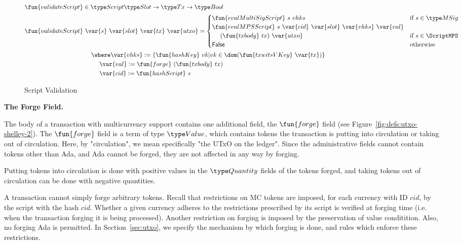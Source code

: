\begin{figure*}[htb]
    \begin{align*}
      \fun{validateScript} & \in\Script\Slot\to\Tx\to\Bool \\
      \fun{validateScript} & ~\var{s}~\var{slot}~\var{tx}~\var{utxo}=
                             \begin{cases}
                               \fun{evalMultiSigScript}~s~vhks & \text{if}~s \in\MSig \\
                               \fun{evalMPSScript}~s~\var{cid}~\var{slot}~\var{vhks}~\var{val} \\
                                ~~~~(\fun{txbody}~tx)~\var{utxo} & \text{if}~s \in\ScriptMPS \\
                               \mathsf{False} & \text{otherwise}
                             \end{cases} \\
                           & ~~~~\where \var{vhks}\leteq \{\fun{hashKey}~vk \vert
                             vk \in \dom(\fun{txwitsVKey}~\var{tx})\} \\
                           & ~~~~~~~~ \var{val} \leteq \fun{forge}~
                              (\fun{txbody}~tx) \\
                           & ~~~~~~~~ \var{cid} \leteq \fun{hashScript}~s
    \end{align*}
  \caption{Script Validation}
  \label{fig:defs:tx-mc-valid}
\end{figure*}

\textbf{The Forge Field.}

The body of a transaction with multicurrency support contains one additional
field, the $\fun{forge}$ field (see Figure~\ref{fig:defs:utxo-shelley-2}).
The $\fun{forge}$ field is a term of type $\Value$, which contains
tokens the transaction is putting into circulation or taking out of
circulation. Here, by "circulation", we mean specifically "the UTxO on the
ledger". Since the administrative fields cannot contain tokens other than Ada,
and Ada cannot be forged, they are not affected in any way by forging.

Putting tokens into circulation is done with positive values in the $\Quantity$
fields of the tokens forged, and taking tokens out of circulation can be done
with negative quantities.

A transaction cannot simply forge arbitrary tokens. Recall that restrictions on
MC tokens are imposed, for each currency with ID $cid$, by the script
with the hash $cid$. Whether a given currency adheres to the restrictions
prescribed by its script is verified at forging time (i.e. when the transaction
forging it is being processed). Another restriction on forging is imposed by
the preservation of value conditition. Also, no forging Ada
is permitted. In Section~\ref{sec:utxo}, we specify the mechanism by which
forging is done, and rules which enforce these restrictions.

